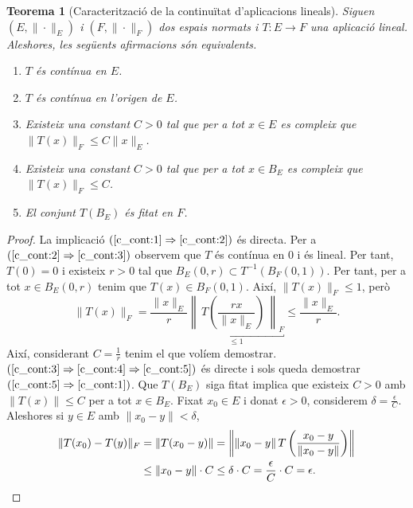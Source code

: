 \documentclass[12pt]{book}
\newtheorem{teorema}{Teorema}[chapter]
\theoremstyle{definition}
\theoremstyle{nota}
\theoremstyle{exemple}
\begin{document}
\begin{teorema}[Caracterització de la continuïtat d'aplicacions lineals]
  \label{teo:caracterització_continuïtat}
  Siguen $(E, \|\cdot\|_E)$ i $(F, \|\cdot\|_F)$ dos espais normats i
  $T : E \to F$ una aplicació lineal. Aleshores, les següents
  afirmacions són equivalents.
  \begin{enumerate}
  \item\label{c_cont:1} $T$ és contínua en $E$.
  \item\label{c_cont:2} $T$ és contínua en l'origen de $E$.
  \item\label{c_cont:3} Existeix una constant $C > 0$ tal que per a
    tot $x \in E$ es compleix que $\|T(x)\|_F \leq C \|x\|_E$.
  \item\label{c_cont:4} Existeix una constant $C > 0$ tal que per a
    tot $x \in B_E$ es compleix que $\|T(x)\|_F \leq C$.
  \item\label{c_cont:5} El conjunt $T(B_E)$ és fitat en $F$.
  \end{enumerate}
\end{teorema}

\begin{proof}
  La implicació $(\ref{c_cont:1} \Rightarrow \ref{c_cont:2})$ és
  directa. Per a $(\ref{c_cont:2} \Rightarrow \ref{c_cont:3})$
  observem que $T$ és contínua en $0$ i és lineal. Per tant,
  $T(0) = 0$ i existeix $r > 0$ tal que
  $B_E(0,r) \subset T^{-1}(B_F(0,1))$. Per tant, per a tot
  $x \in B_E(0,r)$ tenim que $T(x) \in B_F(0,1)$. Així,
  $\|T(x)\|_F \leq 1$, però
  \[
    \|T(x)\|_F = \frac{\|x\|_E}{r} \underbracket{\left\| \,
        T\left(\frac{rx}{\|x\|_E}\right) \, \right\|_F}_{\leq 1} \leq
    \frac{\|x\|_E}{r}.
  \]
  Així, considerant $C = \frac{1}{r}$ tenim el que volíem demostrar.
  $(\ref{c_cont:3} \Rightarrow \ref{c_cont:4} \Rightarrow
  \ref{c_cont:5})$ és directe i sols queda demostrar
  $(\ref{c_cont:5} \Rightarrow \ref{c_cont:1})$. Que $T(B_E)$ siga
  fitat implica que existeix $C > 0$ amb $\|T(x)\| \leq C$ per a tot
  $x \in B_E$. Fixat $x_0 \in E$ i donat $\epsilon > 0$, considerem
  $\delta = \frac{\epsilon}{C}$. Aleshores si $y \in E$ amb
  $\|x_0 - y\| < \delta$,
  \begin{align*}
    \|T(x_0) - T(y)\|_F
    &= \|T(x_0 - y)\| =
      \left\| \|x_0-y\| \, T \left( \frac{x_0 - y}{\|x_0 - y\|}\right) \right\| \\
    &\leq \|x_0 - y\| \cdot C \leq \delta \cdot C = \frac{\epsilon}{C} \cdot C = \epsilon.\qedhere
  \end{align*}
\end{proof}
\end{document}
